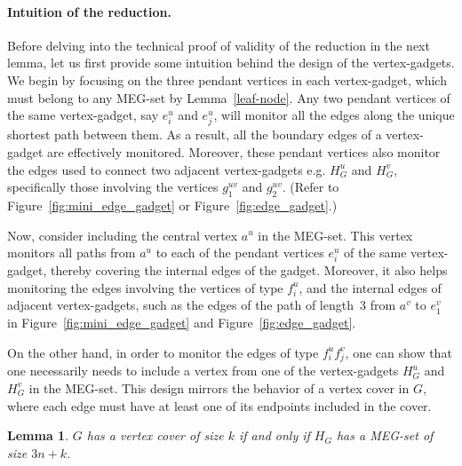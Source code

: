 \documentclass[10pt,a4paper]{article}
\newtheorem{lemma}[theorem]{Lemma}
\begin{document}
\paragraph{Intuition of the reduction.} Before delving into the technical proof of validity of the reduction in the next lemma, let us first provide some intuition behind the design of the vertex-gadgets. We begin by focusing on the three pendant vertices in each vertex-gadget, which must belong to any MEG-set by Lemma~\ref{leaf-node}. Any two pendant vertices of the same vertex-gadget, say $e^u_i$ and $e^u_j$, will monitor all the edges along the unique shortest path between them. As a result, all the boundary edges of a vertex-gadget are effectively monitored. Moreover, these pendant vertices also monitor the edges used to connect two adjacent vertex-gadgets e.g. $H^u_G$ and $H^v_G$, specifically those involving the vertices $g^{uv}_1$ and $g^{uv}_2$. (Refer to Figure~\ref{fig:mini_edge_gadget} or Figure~\ref{fig:edge_gadget}.)

Now, consider including the central vertex $a^u$ in the MEG-set. This vertex monitors all paths from $a^u$ to each of the pendant vertices $e^u_i$ of the same vertex-gadget, thereby covering the internal edges of the gadget. Moreover, it also helps monitoring the edges involving the vertices of type $f^u_i$, and the internal edges of adjacent vertex-gadgets, such as the edges of the path of length~3 from $a^v$ to $e_1^v$ in Figure~\ref{fig:mini_edge_gadget} and Figure~\ref{fig:edge_gadget}.

On the other hand, in order to monitor the edges of type $f_i^uf_j^v$, one can show that one necessarily needs to include a vertex from one of the vertex-gadgets $H^u_G$ and $H^v_G$ in the MEG-set. 
This design mirrors the behavior of a vertex cover in $G$, where each edge must have at least one of its endpoints included in the cover.

\begin{lemma} \label{lem:meg}
    $G$ has a vertex cover of size $k$ if and only if $H_G$ has a MEG-set of size $3n + k$.
\end{lemma}
\end{document}
